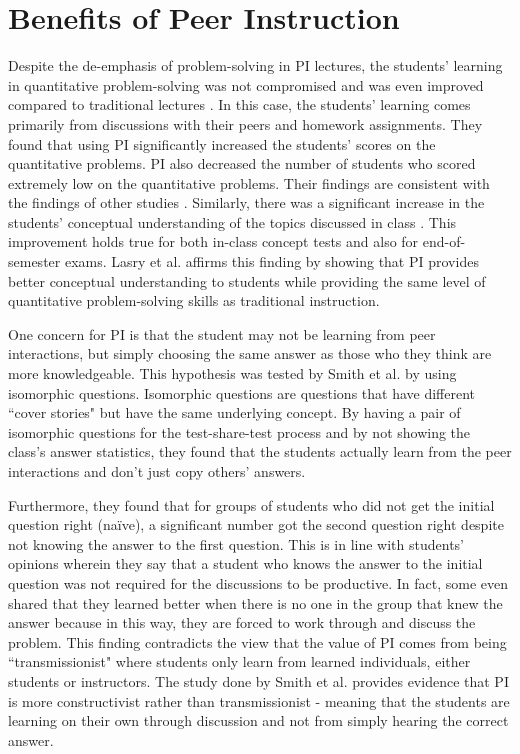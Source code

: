 \section{Benefits of Peer Instruction}
Despite the de-emphasis of problem-solving in PI lectures, the students' learning in quantitative problem-solving was not compromised and was even improved compared to traditional lectures \cite{crouch2001peer}.
In this case, the students' learning comes primarily from discussions with their peers and homework assignments.
They found that using PI significantly increased the students' scores on the quantitative problems.
PI also decreased the number of students who scored extremely low on the quantitative problems.
Their findings are consistent with the findings of other studies \cite{thacker1994comparing,lasry2008peer}.
Similarly, there was a significant increase in the students' conceptual understanding of the topics discussed in class \cite{crouch2001peer}.
This improvement holds true for both in-class concept tests and also for end-of-semester exams.
Lasry et al. \cite{lasry2008peer} affirms this finding by showing that PI provides better conceptual understanding to students while providing the same level of quantitative problem-solving skills as traditional instruction.

One concern for PI is that the student may not be learning from peer interactions, but simply choosing the same answer as those who they think are more knowledgeable.
This hypothesis was tested by Smith et al. \cite{smith2009peer} by using isomorphic questions.
Isomorphic questions are questions that have different ``cover stories" but have the same underlying concept.
By having a pair of isomorphic questions for the test-share-test process and by not showing the class's answer statistics, they found that the students actually learn from the peer interactions and don't just copy others' answers.

Furthermore, they found that for groups of students who did not get the initial question right (naïve), a significant number got the second question right despite not knowing the answer to the first question.
This is in line with students' opinions wherein they say that a student who knows the answer to the initial question was not required for the discussions to be productive.
In fact, some even shared that they learned better when there is no one in the group that knew the answer because in this way, they are forced to work through and discuss the problem.
This finding contradicts the view that the value of PI comes from being ``transmissionist" where students only learn from learned individuals, either students or instructors.
The study done by Smith et al. \cite{smith2009peer} provides evidence that PI is more constructivist rather than transmissionist - meaning that the students are learning on their own through discussion and not from simply hearing the correct answer.

